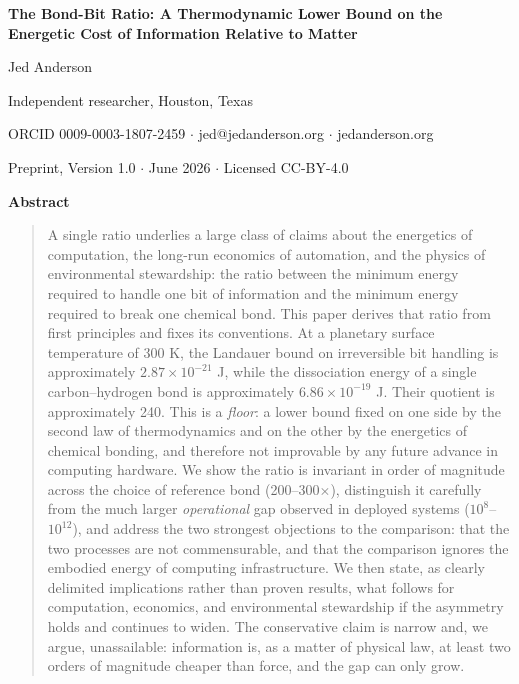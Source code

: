 \documentclass[11pt]{article}
\begin{document}
\begin{center}
{\Large\bfseries The Bond-Bit Ratio: A Thermodynamic Lower Bound on the\\[3pt]
Energetic Cost of Information Relative to Matter\par}

\vspace{1.4em}
{\large Jed Anderson\par}
\vspace{0.4em}
Independent researcher, Houston, Texas\par
\vspace{0.2em}
ORCID 0009-0003-1807-2459 $\cdot$ jed@jedanderson.org $\cdot$ jedanderson.org\par

\vspace{1.0em}
Preprint, Version 1.0 $\cdot$ June 2026 $\cdot$ Licensed CC-BY-4.0\par
\end{center}

\vspace{0.8em}

\begin{center}\textbf{Abstract}\end{center}
\begin{quote}
A single ratio underlies a large class of claims about the energetics of computation, the long-run economics of automation, and the physics of environmental stewardship: the ratio between the minimum energy required to handle one bit of information and the minimum energy required to break one chemical bond. This paper derives that ratio from first principles and fixes its conventions. At a planetary surface temperature of 300 K, the Landauer bound on irreversible bit handling is approximately $2.87 \times 10^{-21}$ J, while the dissociation energy of a single carbon--hydrogen bond is approximately $6.86 \times 10^{-19}$ J. Their quotient is approximately 240. This is a \emph{floor}: a lower bound fixed on one side by the second law of thermodynamics and on the other by the energetics of chemical bonding, and therefore not improvable by any future advance in computing hardware. We show the ratio is invariant in order of magnitude across the choice of reference bond (200--300$\times$), distinguish it carefully from the much larger \emph{operational} gap observed in deployed systems ($10^{8}$--$10^{12}$), and address the two strongest objections to the comparison: that the two processes are not commensurable, and that the comparison ignores the embodied energy of computing infrastructure. We then state, as clearly delimited implications rather than proven results, what follows for computation, economics, and environmental stewardship if the asymmetry holds and continues to widen. The conservative claim is narrow and, we argue, unassailable: information is, as a matter of physical law, at least two orders of magnitude cheaper than force, and the gap can only grow.
\end{quote}
\end{document}
